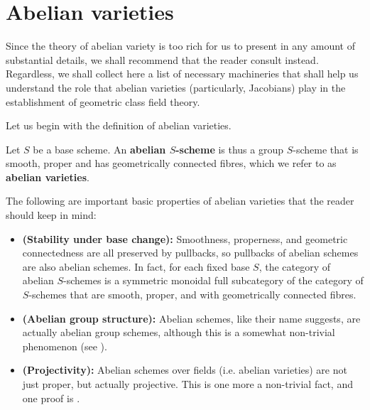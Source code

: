 \section{Abelian varieties}
    Since the theory of abelian variety is too rich for us to present in any amount of substantial details, we shall recommend that the reader consult \cite{bhatt_abelian_varieties} instead. Regardless, we shall collect here a list of necessary machineries that shall help us understand the role that abelian varieties (particularly, Jacobians) play in the establishment of geometric class field theory.
    
    Let us begin with the definition of abelian varieties.
    \begin{definition} \label{def: abelian_varieties}
        Let $S$ be a base scheme. An \textbf{abelian $S$-scheme} is thus a group $S$-scheme that is smooth, proper and has geometrically connected fibres, which we refer to as \textbf{abelian varieties}.
    \end{definition}
    \begin{remark} \label{remark: basic_properties_of_abelian_varieties}
        The following are important basic properties of abelian varieties that the reader should keep in mind:
        \begin{itemize}
            \item \textbf{(Stability under base change):} Smoothness, properness, and geometric connectedness are all preserved by pullbacks, so pullbacks of abelian schemes are also abelian schemes. In fact, for each fixed base $S$, the category of abelian $S$-schemes is a symmetric monoidal full subcategory of the category of $S$-schemes that are smooth, proper, and with geometrically connected fibres.  
            \item \textbf{(Abelian group structure):} Abelian schemes, like their name suggests, are actually abelian group schemes, although this is a somewhat non-trivial phenomenon (see \cite[Proposition 2.1 and Corollaries 2.2, 2.3, and 2.4]{bhatt_abelian_varieties}). 
            \item \textbf{(Projectivity):} Abelian schemes over fields (i.e. abelian varieties) are not just proper, but actually projective. This is one more a non-trivial fact, and one proof is \cite[Theorem 11.1]{bhatt_abelian_varieties}.
        \end{itemize}
    \end{remark}
